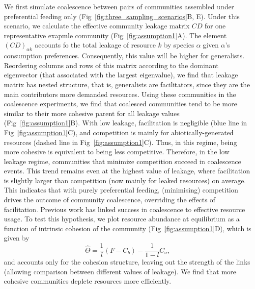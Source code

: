 \documentclass[10pt,letterpaper]{article}
\begin{document}
We first simulate coalescence between pairs of communities assembled under preferential feeding only (Fig~\ref{fig:three_sampling_scenarios}B, E). Under this scenario, we calculate the effective community leakage matrix $CD$ for one representative exapmle community (Fig~\ref{fig:assumption1}A). The element $(CD)_{\alpha k}$ accounts fo the total leakage of resource $k$ by species $\alpha$  given $\alpha$'s consumption preferences. Consequently, this value will be higher for generalists. Reordering columns and rows of this matrix according to the dominant eigenvector (that associated with the largest eigenvalue), we find that leakage matrix has nested structure, that is, generalists are facilitators, since they are the main contributors more demanded resources. Using these communities in the coalescence experiments, we find that coalesced communities tend to be more similar to their more cohesive parent for all leakage values (Fig~\ref{fig:assumption1}B). With low leakage, facilitation is negligible (blue line in Fig~\ref{fig:assumption1}C), and competition is mainly for abiotically-generated resources (dashed line in Fig~\ref{fig:assumption1}C). Thus, in this regime, being more cohesive is equivalent to being less competitive. Therefore, in the low leakage regime, communities that minimize competition succeed in coalescence events. This trend remains even at the highest value of leakage, where facilitation is slightly larger than competition (now mainly for leaked resources) on average. This indicates that with purely preferential feeding, (minimising) competition drives the outcome of community coalescence, overriding the effects of facilitation. Previous work has linked success in  coalescence to effective resource usage. To test this hypothesis, we plot  resource abundance at equilibrium as a function of intrinsic cohesion of the community (Fig~\ref{fig:assumption1}D), which is given by
\begin{equation}
    \hat{\Theta} = \frac{1}{l}(F - C_b) - \frac{1}{1-l}C_a,
\end{equation}
and accounts only for the cohesion structure, leaving out the strength of the links (allowing comparison between different values of leakage). We find that more cohesive communities deplete resources more efficiently.
\end{document}
